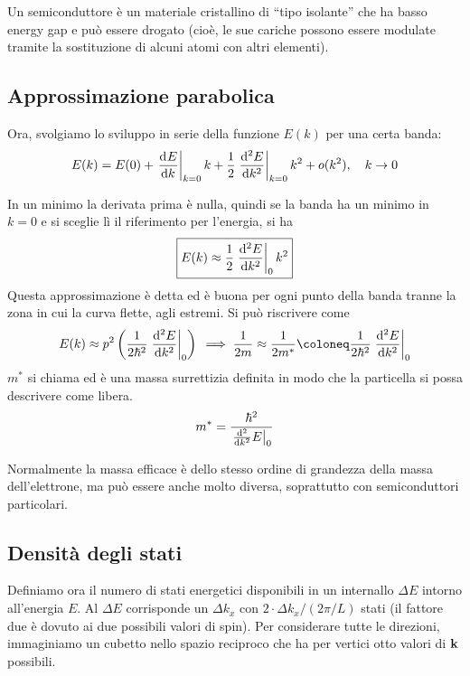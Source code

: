 Un semiconduttore è un materiale cristallino di ``tipo isolante'' che ha basso energy gap e può essere drogato (cioè, le sue cariche possono essere modulate tramite la sostituzione di alcuni atomi con altri elementi).

\subsection{Approssimazione parabolica}

Ora, svolgiamo lo sviluppo in serie della funzione $E(k)$ per una certa banda:
\begin{equation}
    E(k) = E(0) + \evalat{\der[E]{k}}{k = 0} k + \frac{1}{2} \evalat{\der[E][2]{k}}{k = 0} k^2 + o(k^2), \quad k \to 0
\end{equation}

In un minimo la derivata prima è nulla, quindi se la banda ha un minimo in $k = 0$ e si sceglie lì il riferimento per l'energia, si ha
\begin{equation}
\label{eq:approssparabolica}
    \boxed{
    E(k) \approx \frac{1}{2} \evalat{\der[E][2]{k}}{0} k^2
    }
\end{equation}
Questa approssimazione è detta  ed è buona per ogni punto della banda tranne la zona in cui la curva flette, agli estremi.
Si può riscrivere come
\begin{equation}
    E(k) \approx p^2 \pts{\frac{1}{2 \hbar^2} \evalat{\der[E][2]{k}}{0}} \\
    \implies \frac{1}{2 m} \approx \frac{1}{2 m^*} \coloneq \frac{1}{2 \hbar^2} \evalat{\der[E][2]{k}}{0}
\end{equation}
$m^*$ si chiama  ed è una massa surrettizia definita in modo che la particella si possa descrivere come libera.
\begin{equation}
    m^* = \frac{\hbar^2}{\evalat{\der[E][2]{k}}{0}}
\end{equation}

Normalmente la massa efficace è dello stesso ordine di grandezza della massa dell'elettrone, ma può essere anche molto diversa, soprattutto con semiconduttori particolari.

\subsection{Densità degli stati}

Definiamo ora il numero di stati energetici disponibili in un internallo $\Delta E$ intorno all'energia $E$.
Al $\Delta E$ corrisponde un $\Delta k_x$ con $2 \cdot \Delta k_x / (2\pi / L)$ stati (il fattore due è dovuto ai due possibili valori di spin).
Per considerare tutte le direzioni, immaginiamo un cubetto nello spazio reciproco che ha per vertici otto valori di $\mathbf{k}$ possibili.


